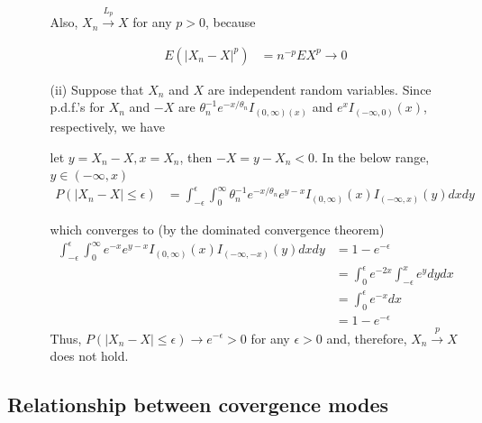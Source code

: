 \documentclass[11pt]{article} %
\begin{document}
\begin{itemize}
\begin{itemize}
Also, $X_n \xrightarrow {L_p} X$ for any $p > 0$, because

 \begin{align*}
	E(| X_n -X |^{p}) &= n^{-p} EX^{p} \rightarrow 0
\end{align*}

\item[(ii)] Suppose that $X_n$ and $X$ are independent random variables. Since p.d.f.'s for $X_n$ and $-X$ are $\theta_n^{-1} e^{-x/\theta_n} I_{(0,\infty)(x)}$ and $e^x I_{(-\infty, 0)} (x)$, respectively, we have

let $y = X_n -X, x= X_n$, then $-X = y-X_n < 0$. In the below range, $y \in (-\infty, x)$
 \begin{align*}
	P(| X_n -X | \leq \epsilon) &= \int_{-\epsilon}^{\epsilon} \int_{0}^{\infty} \theta_n^{-1} e^{-x/\theta_n} e^{y-x} I_{(0, \infty)}(x) I_{(-\infty, x)}(y)  dx dy
\end{align*}

which converges to (by the dominated convergence theorem)
 \begin{align*}
 \int_{-\epsilon}^{\epsilon} \int_{0}^{\infty}  e^{-x} e^{y-x} I_{(0, \infty)}(x) I_{(-\infty, -x)}(y)  dx dy & = 1- e^{-\epsilon} \\
&=  \int_{0}^{\epsilon}  e^{-2x} \int_{-\epsilon}^{x} e^y dy dx \\
&=  \int_{0}^{\epsilon} e^{-x} dx \\
&= 1- e^{-\epsilon} 
\end{align*}
Thus, $P(| X_n -X | \leq \epsilon) \rightarrow e^{-\epsilon} > 0$ for any $\epsilon > 0$ and, therefore, $X_n \xrightarrow {p} X$ does not hold.

\end{itemize}

\end{itemize}


\subsection{Relationship between covergence modes}
\end{document}
